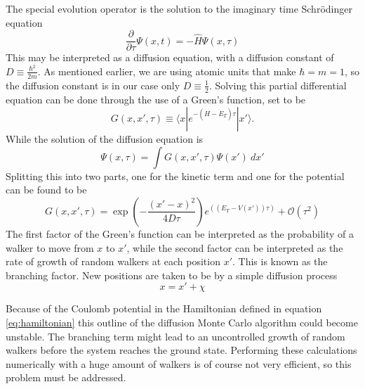 \documentclass[aps,prb,twocolumn,floatfix]{revtex4}
\begin{document}
The special evolution operator is the solution to the imaginary time Schrödinger equation
\begin{equation}
    \frac{\partial}{\partial \tau} \Psi(x,t) = - \hat H \Psi(x,\tau)
\end{equation}
This may be interpreted as a diffusion equation, with a diffusion constant of $D \equiv \frac{\hbar^2}{2m}$. As mentioned earlier, we are using atomic units that make $\hbar = m = 1$, so the diffusion constant is in our case only $D \equiv \frac{1}{2}$. Solving this partial differential equation can be done through the use of a Green's function, set to be
\begin{equation}
    G(x,x',\tau) \equiv \langle x | e^{-(\hat H - E_{T})\tau} | x' \rangle.
\end{equation} 
While the solution of the diffusion equation is
\begin{equation}
    \Psi (x,\tau) = \int G(x,x',\tau) \Psi(x') ~dx'
\end{equation} 
Splitting this into two parts, one for the kinetic term and one for the potential can be found to be\cite{lecturenotes}
\begin{equation}
    G(x,x',\tau) = \exp \left( - \frac{(x'-x)^2}{4D\tau} \right) e^{((E_T - V(x'))\tau)} + \mathcal{O}(\tau^2)
\end{equation}
The first factor of the Green's function can be interpreted as the probability of a walker to move from $x$ to $x'$, while the second factor can be interpreted as the rate of growth of random walkers at each position $x'$. This is known as the branching factor. New positions are taken to be by a simple diffusion process
\begin{equation}
    x = x' + \chi
\end{equation} 

Because of the Coulomb potential in the Hamiltonian defined in equation \ref{eq:hamiltonian} this outline of the diffusion Monte Carlo algorithm could become unstable. The branching term might lead to an uncontrolled growth of random walkers before the system reaches the ground state. Performing these calculations numerically with a huge amount of walkers is of course not very efficient, so this problem must be addressed.
\end{document}
